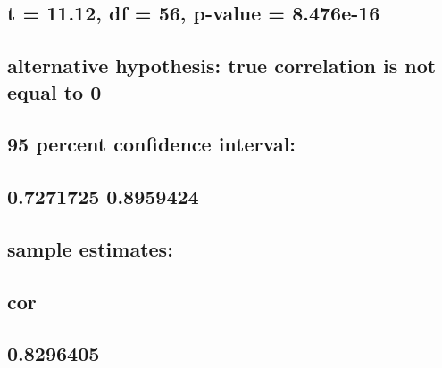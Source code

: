 \documentclass[
  12pt,
]{article}
\begin{document}
\hypertarget{t-11.12-df-56-p-value-8.476e-16}{%
\subsection{t = 11.12, df = 56, p-value =
8.476e-16}\label{t-11.12-df-56-p-value-8.476e-16}}

\hypertarget{alternative-hypothesis-true-correlation-is-not-equal-to-0-5}{%
\subsection{alternative hypothesis: true correlation is not equal to
0}\label{alternative-hypothesis-true-correlation-is-not-equal-to-0-5}}

\hypertarget{percent-confidence-interval-5}{%
\subsection{95 percent confidence
interval:}\label{percent-confidence-interval-5}}

\hypertarget{section-52}{%
\subsection{0.7271725 0.8959424}\label{section-52}}

\hypertarget{sample-estimates-5}{%
\subsection{sample estimates:}\label{sample-estimates-5}}

\hypertarget{cor-5}{%
\subsection{cor}\label{cor-5}}

\hypertarget{section-53}{%
\subsection{0.8296405}\label{section-53}}

\begin{verbatim}
\end{verbatim}

\hypertarget{section-54}{%
\subsection{}\label{section-54}}
\end{document}
